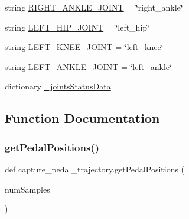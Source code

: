 \begin{DoxyCompactItemize}
\item 
string \mbox{\hyperlink{namespacecapture__pedal__trajectory_aeaa979292407a578df6b6ed8088b908d}{R\+I\+G\+H\+T\+\_\+\+A\+N\+K\+L\+E\+\_\+\+J\+O\+I\+NT}} = \char`\"{}right\+\_\+ankle\char`\"{}
\item 
string \mbox{\hyperlink{namespacecapture__pedal__trajectory_ae837fb7d509f64b8c35bad991e20eb06}{L\+E\+F\+T\+\_\+\+H\+I\+P\+\_\+\+J\+O\+I\+NT}} = \char`\"{}left\+\_\+hip\char`\"{}
\item 
string \mbox{\hyperlink{namespacecapture__pedal__trajectory_a4ac7e5482c7632b894bddac8c4e4c314}{L\+E\+F\+T\+\_\+\+K\+N\+E\+E\+\_\+\+J\+O\+I\+NT}} = \char`\"{}left\+\_\+knee\char`\"{}
\item 
string \mbox{\hyperlink{namespacecapture__pedal__trajectory_a498ea7bdb7ff782e4c26e38ec4c119c7}{L\+E\+F\+T\+\_\+\+A\+N\+K\+L\+E\+\_\+\+J\+O\+I\+NT}} = \char`\"{}left\+\_\+ankle\char`\"{}
\item 
dictionary \mbox{\hyperlink{namespacecapture__pedal__trajectory_a240d770bc46f43f1b4e5591bf959fd9b}{\+\_\+joints\+Status\+Data}}
\end{DoxyCompactItemize}


\subsection{Function Documentation}
\mbox{\label{namespacecapture__pedal__trajectory_a73fc41de533fbb350b426e9c08886203}} 
\subsubsection{\texorpdfstring{getPedalPositions()}{getPedalPositions()}}
{\footnotesize\ttfamily def capture\+\_\+pedal\+\_\+trajectory.\+get\+Pedal\+Positions (\begin{DoxyParamCaption}\item[{}]{num\+Samples }\end{DoxyParamCaption})}

\mbox{\label{namespacecapture__pedal__trajectory_a8d1d532a39c3c5a5efe8d6110ecd1723}} 
